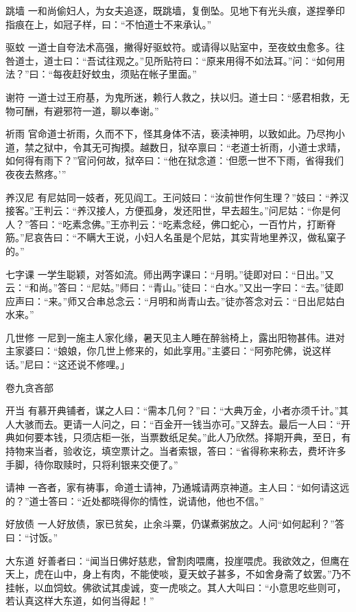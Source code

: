 \documentclass[12pt,UTF8]{ctexbook}
\begin{document}
跳墙
一和尚偷妇人，为女夫追逐，既跳墙，复倒坠。见地下有光头痕，遂捏拳印指痕在上，如冠子样，曰：“不怕道士不来承认。”

驱蚊
一道士自夸法术高强，撇得好驱蚊符。或请得以贴室中，至夜蚊虫愈多。往咎道士，道士曰：“吾试往观之。”见所贴符曰：“原来用得不如法耳。”问：“如何用法？”曰：“每夜赶好蚊虫，须贴在帐子里面。”

谢符
一道士过王府基，为鬼所迷，赖行人救之，扶以归。道士曰：“感君相救，无物可酬，有避邪符一道，聊以奉谢。”

祈雨
官命道士祈雨，久而不下，怪其身体不洁，亵渎神明，以致如此。乃尽拘小道，禁之狱中，令其无可掏摸。越数日，狱卒禀曰：“老道士祈雨，小道士求晴，如何得有雨下？”官问何故，狱卒曰：“他在狱念道：‘但愿一世不下雨，省得我们夜夜去熬疼。’”

养汉尼
有尼姑同一妓者，死见阎工。王问妓曰：“汝前世作何生理？”妓曰：“养汉接客。”王判云：“养汉接人，方便孤身，发还阳世，早去超生。”问尼姑：“你是何人？”答曰：“吃素念佛。”王亦判云：“吃素念经，佛口蛇心，一百竹片，打断脊筋。”尼哀告曰：“不瞒大王说，小妇人名虽是个尼姑，其实背地里养汉，做私窠子的。”

七字课
一学生聪颖，对答如流。师出两字课曰：“月明。”徒即对曰：“日出。”又云：“和尚。”答曰：“尼姑。”师曰：“青山。”徒曰：“白水。”又出一字曰：“去。”徒即应声曰：“来。”师又合串总念云：“月明和尚青山去。”徒亦答念对云：“日出尼姑白水来。”

几世修
一尼到一施主人家化缘，暑天见主人睡在醉翁椅上，露出阳物甚伟。进对主家婆曰：“娘娘，你几世上修来的，如此享用。”主婆曰：“阿弥陀佛，说这样话。”尼曰：“这还说不修哩。」

卷九贪吝部

开当
有慕开典铺者，谋之人曰：“需本几何？”曰：“大典万金，小者亦须千计。”其人大骇而去。更请一人问之，曰：“百金开一钱当亦可。”又辞去。最后一人曰：“开典如何要本钱，只须店柜一张，当票数纸足矣。”此人乃欣然。择期开典，至日，有持物来当者，验收讫，填空票计之。当者索银，答曰：“省得称来称去，费坏许多手脚，待你取赎时，只将利银来交便了。”

请神
一吝者，家有祷事，命道士请神，乃通城请两京神道。主人曰：“如何请这远的？”道士答曰：“近处都晓得你的情性，说请他，他也不信。”

好放债
一人好放债，家已贫矣，止余斗粟，仍谋煮粥放之。人问“如何起利？”答曰：“讨饭。”

大东道
好善者曰：“闻当日佛好慈悲，曾割肉喂鹰，投崖喂虎。我欲效之，但鹰在天上，虎在山中，身上有肉，不能使啖，夏天蚊子甚多，不如舍身斋了蚊罢。”乃不挂帐，以血饲蚊。佛欲试其虔诚，变一虎啖之。其人大叫曰：“小意思吃些则可，若认真这样大东道，如何当得起！”
\end{document}
